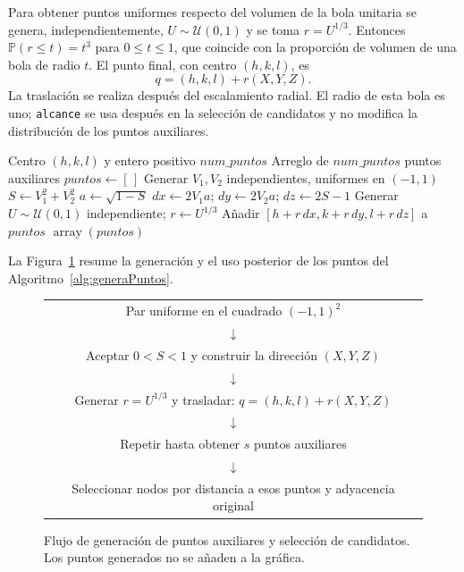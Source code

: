 Para obtener puntos uniformes respecto del volumen de la bola unitaria se genera, independientemente, $U\sim\mathcal U(0,1)$ y se toma $r=U^{1/3}$. Entonces $\mathbb P(r\leq t)=t^3$ para $0\leq t\leq1$, que coincide con la proporción de volumen de una bola de radio $t$. El punto final, con centro $(h,k,l)$, es
\[
q=(h,k,l)+r(X,Y,Z).
\]
La traslación se realiza después del escalamiento radial. El radio de esta bola es uno; \texttt{alcance} se usa después en la selección de candidatos y no modifica la distribución de los puntos auxiliares.

\begin{algorithm}[H]
\caption{Generación de puntos uniformes dentro de una bola unitaria}
\label{alg:generaPuntos}
\begin{algorithmic}[1]
\Require Centro $(h,k,l)$ y entero positivo $num\_puntos$
\Ensure Arreglo de $num\_puntos$ puntos auxiliares
    \State $puntos\gets[\,]$
        \Repeat
            \State Generar $V_1,V_2$ independientes, uniformes en $(-1,1)$
            \State $S\gets V_1^2+V_2^2$
        \State $a\gets\sqrt{1-S}$
        \State $dx\gets2V_1a$; $dy\gets2V_2a$; $dz\gets2S-1$
        \State Generar $U\sim\mathcal U(0,1)$ independiente; $r\gets U^{1/3}$
        \State Añadir $[h+r\,dx,k+r\,dy,l+r\,dz]$ a $puntos$
    \EndFor
    \State \Return $\operatorname{array}(puntos)$
\EndFunction
\end{algorithmic}
\end{algorithm}

La Figura~\ref{fig:flujo algoritmo} resume la generación y el uso posterior de los puntos del Algoritmo~\ref{alg:generaPuntos}.
\begin{figure}[H]
\centering
\begin{tabular}{c}
Par uniforme en el cuadrado $(-1,1)^2$\\
$\downarrow$\\
Aceptar $0<S<1$ y construir la dirección $(X,Y,Z)$\\
$\downarrow$\\
Generar $r=U^{1/3}$ y trasladar: $q=(h,k,l)+r(X,Y,Z)$\\
$\downarrow$\\
Repetir hasta obtener $s$ puntos auxiliares\\
$\downarrow$\\
Seleccionar nodos por distancia a esos puntos y adyacencia original
\end{tabular}
\caption{Flujo de generación de puntos auxiliares y selección de candidatos. Los puntos generados no se añaden a la gráfica.}
\label{fig:flujo algoritmo}
\end{figure}


